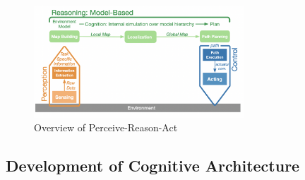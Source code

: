 \documentclass[%
paper=A4,               %
twoside=true,           %
openright,              %
11pt,                   %
bibliography=totoc,     %
titlepage=on,           %
DIV=12,                 %
BCOR=1.5cm,             %
parskip=half,            %
final
]{scrreprt}
\begin{document}
	\begin{figure}[ht] 
		\centering
		\includegraphics[width=0.7\textwidth]{Graphics/PRA}
		\caption{Overview of Perceive-Reason-Act \autocite{schillingAutonomeSystemeUnd2023}}
		\label{fig: fig1}
	\end{figure}
	
	
	\subsection{Development of Cognitive Architecture} 
	
\end{document}
